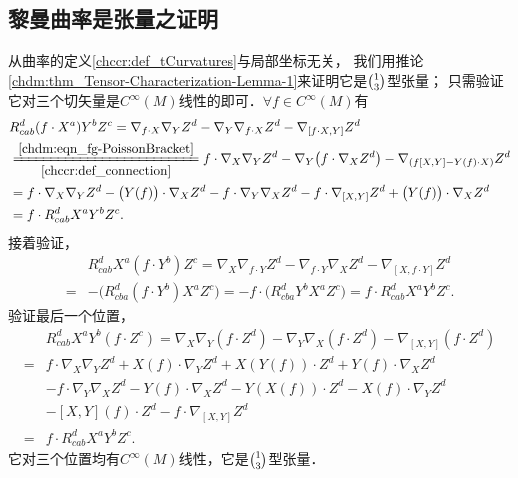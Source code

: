 
\subsection{黎曼曲率是张量之证明}\label{chccr:sec_rit}
从曲率的定义\ref{chccr:def_tCurvatures}与局部坐标无关，
我们用推论\ref{chdm:thm_Tensor-Characterization-Lemma-1}来证明它是$\binom{1}{3}$型张量；
只需验证它对三个切矢量是$C^\infty(M)$线性的即可．$\forall f\in C^\infty(M)$有
\begin{align*}
    &R_{ cab}^d{(f\cdot X^a)}{Y^b}{Z^c} = {\nabla _{f\cdot X}}{\nabla _Y}{Z^d} -
      {\nabla _Y}{\nabla _{f\cdot X}}{Z^d} - {\nabla _{[f\cdot X,Y]}}{Z^d} \\
    &\xlongequal[\ref{chccr:def_connection}]{\eqref{chdm:eqn_fg-PoissonBracket}}
    f\cdot{\nabla _{X}}{\nabla _Y}{Z^d} - {\nabla _Y}\bigl(f\cdot {\nabla _{ X}}{Z^d} \bigr)
    - {\nabla _{(f[X,Y]- Y(f)\cdot X)}}{Z^d}    \\
    &= f\cdot{\nabla _{X}}{\nabla _Y}{Z^d} - \bigl(Y(f) \bigr)\cdot {\nabla _{ X}}{Z^d}
    - f\cdot {\nabla _Y} {\nabla _{ X}}{Z^d}
     -f\cdot {\nabla _{[X,Y]}}{Z^d} +\bigl(Y(f)\bigr) \cdot{\nabla _{X}}{Z^d} \\
    &=  f\cdot R_{ cab}^d{ X^a}{Y^b}{Z^c} .
\end{align*}
接着验证，
\begin{align*}
    & R_{ cab}^d {X^a}{(f\cdot Y^b)}{Z^c} = {\nabla _{X}}{\nabla _{f \cdot Y}}{Z^d} -
    {\nabla _{f\cdot Y}}{\nabla _{X}}{Z^d} - {\nabla _{[X,f\cdot Y]}}{Z^d} \\
    = & -\bigl( R_{ cba}^d {(f\cdot Y^b)} {X^a}{Z^c} \bigr)
    = -f\cdot \bigl( R_{ cba}^d { Y^b} {X^a}{Z^c} \bigr)
     = f \cdot  R_{ cab}^d {X^a}{ Y^b}{Z^c} .
\end{align*}
验证最后一个位置，
\begin{align*}
    &R_{cab}^d {X^a}{Y^b}{(f\cdot Z^c)} = {\nabla _{X}}{\nabla _{Y}}{(f\cdot Z^d)} -
    {\nabla _{Y}}{\nabla _{X}}{(f\cdot Z^d)} - {\nabla _{[X,Y]}}{(f\cdot Z^d)} \\
    =&f\cdot {\nabla _{X}}{\nabla _{Y}}{Z^d} + {X(f)} \cdot {\nabla _{Y}}{Z^d}
     +X\left(  Y(f)\right) \cdot Z^d +Y(f)\cdot {\nabla _{X}}  Z^d \\
    &-f\cdot {\nabla _{Y}}{\nabla _{X}}{Z^d} - {Y(f)} \cdot {\nabla _{X}}{Z^d}
     -Y\left(  X(f)\right) \cdot Z^d -X(f)\cdot {\nabla _{Y}}  Z^d \\
    & - [X,Y](f) \cdot Z^d - f\cdot {\nabla _{[X,Y]}}{Z^d} \\
    =& f \cdot  R_{ cab}^d {X^a}{ Y^b}{Z^c} .
\end{align*}
它对三个位置均有$C^\infty(M)$线性，它是$\binom{1}{3}$型张量．


